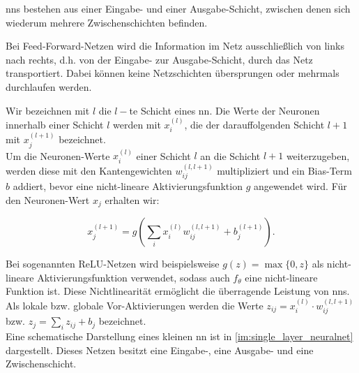 \documentclass[twoside, 12pt,a4paper]{book}
\numberwithin{equation}{section}
\begin{document}
	\noindent \acp{nn} bestehen aus einer Eingabe- und einer Ausgabe-Schicht, zwischen denen sich wiederum mehrere Zwischenschichten befinden.
	
	\noindent Bei Feed-Forward-Netzen wird die Information im Netz ausschließlich von links nach rechts, d.h. von der Eingabe- zur Ausgabe-Schicht, durch das Netz transportiert. Dabei können keine Netzschichten übersprungen oder mehrmals durchlaufen werden.
	
	\noindent Wir bezeichnen mit $l$ die $l-$te Schicht eines \ac{nn}. Die Werte der Neuronen innerhalb einer Schicht $l$ werden mit $x_i^{(l)}$, die der darauffolgenden Schicht $l+1$ mit $x_j^{(l+1)}$ bezeichnet.\\
	
	\noindent Um die Neuronen-Werte $x_i^{(l)}$ einer Schicht $l$ an die Schicht $l+1$ weiterzugeben, werden diese mit den Kantengewichten $w_{ij}^{(l,l+1)}$ multipliziert und ein Bias-Term $b$ addiert, bevor eine nicht-lineare Aktivierungsfunktion $g$ angewendet wird. Für den Neuronen-Wert $x_j$ erhalten wir:
	
	\begin{equation}
		x_j^{(l+1)} = g(\sum_i{x_i^{(l)}w_{ij}^{(l,l+1)} + b_j^{(l+1)}}).
	\end{equation}
	
	\noindent Bei sogenannten ReLU-Netzen wird beispielsweise $g(z) = \max{\lbrace 0,z \rbrace}$ als nicht-lineare Aktivierungsfunktion verwendet, sodass auch $f_\theta$ eine nicht-lineare Funktion ist. Diese Nichtlinearität ermöglicht die überragende Leistung von \acp{nn}.\\
	
	\noindent Als lokale bzw. globale Vor-Aktivierungen werden die Werte $z_{ij} = x_i^{(l)} \cdot w_{ij}^{(l,l+1)}$ bzw. $z_j = \sum_iz_{ij} + b_j$ bezeichnet.\\
	
	\noindent Eine schematische Darstellung eines kleinen \ac{nn} ist in \autoref{im:single_layer_neuralnet} dargestellt. Dieses Netzen  besitzt eine Eingabe-, eine Ausgabe- und eine Zwischenschicht.
	
\end{document}
